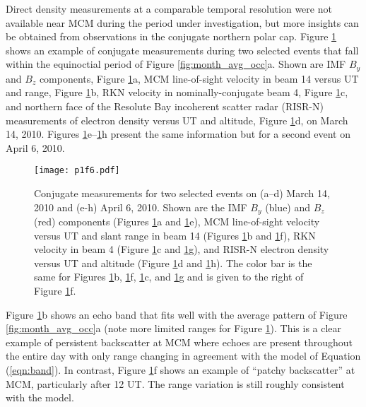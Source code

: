 Direct density measurements at a comparable temporal resolution were not available near MCM during the period under investigation, but more insights can be obtained from observations in the conjugate northern polar cap. Figure \ref{fig:patchy_example} shows an example of conjugate measurements during two selected events that fall within the equinoctial period of Figure \ref{fig:month_avg_occ}a. Shown are IMF \(B_y\) and \(B_z\) components, Figure \ref{fig:patchy_example}a, MCM line-of-sight velocity in beam 14 versus UT and range, Figure \ref{fig:patchy_example}b, RKN velocity in nominally-conjugate beam 4, Figure \ref{fig:patchy_example}c, and northern face of the Resolute Bay incoherent scatter radar (RISR-N) measurements of electron density versus UT and altitude, Figure \ref{fig:patchy_example}d, on March 14, 2010. Figures \ref{fig:patchy_example}e--\ref{fig:patchy_example}h present the same information but for a second event on April 6, 2010.

\begin{figure}
	\centering
	\texttt{[image: p1f6.pdf]}
	\caption[An example of conjugate observations of patchy backscatter]{Conjugate measurements for two selected events on (a--d) March 14, 2010 and (e-h) April 6, 2010. Shown are the IMF \(B_y\) (blue) and \(B_z\) (red) components (Figures \ref{fig:patchy_example}a and \ref{fig:patchy_example}e), MCM line-of-sight velocity versus UT and slant range in beam 14 (Figures \ref{fig:patchy_example}b and \ref{fig:patchy_example}f), RKN velocity in beam 4 (Figure \ref{fig:patchy_example}c and \ref{fig:patchy_example}g), and RISR-N electron density versus UT and altitude (Figure \ref{fig:patchy_example}d and \ref{fig:patchy_example}h). The color bar is the same for Figures \ref{fig:patchy_example}b, \ref{fig:patchy_example}f, \ref{fig:patchy_example}c, and \ref{fig:patchy_example}g and is given to the right of Figure \ref{fig:patchy_example}f.}
	\label{fig:patchy_example}
\end{figure}

Figure \ref{fig:patchy_example}b shows an echo band that fits well with the average pattern of Figure \ref{fig:month_avg_occ}a (note more limited ranges for Figure \ref{fig:patchy_example}). This is a clear example of persistent backscatter at MCM where echoes are present throughout the entire day with only range changing in agreement with the model of Equation (\ref{eqn:band}). In contrast, Figure \ref{fig:patchy_example}f shows an example of ``patchy backscatter'' at MCM, particularly after 12 UT. The range variation is still roughly consistent with the model. 

